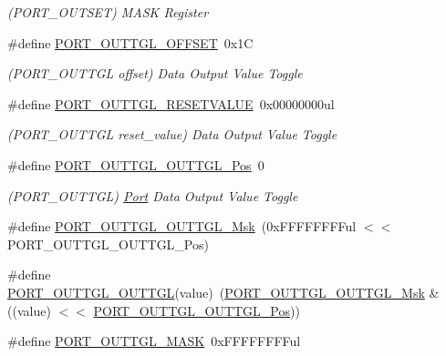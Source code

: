 \begin{DoxyCompactItemize}
\begin{DoxyCompactList}\small\item\em (P\+O\+R\+T\+\_\+\+O\+U\+T\+S\+ET) M\+A\+SK Register \end{DoxyCompactList}\item 
\#define \mbox{\hyperlink{group___s_a_m_d21___p_o_r_t_ga661859dca022c7deb7a367616d203747}{P\+O\+R\+T\+\_\+\+O\+U\+T\+T\+G\+L\+\_\+\+O\+F\+F\+S\+ET}}~0x1C
\begin{DoxyCompactList}\small\item\em (P\+O\+R\+T\+\_\+\+O\+U\+T\+T\+GL offset) Data Output Value Toggle \end{DoxyCompactList}\item 
\#define \mbox{\hyperlink{group___s_a_m_d21___p_o_r_t_ga487997310b5fc1ce56e003c201da8df2}{P\+O\+R\+T\+\_\+\+O\+U\+T\+T\+G\+L\+\_\+\+R\+E\+S\+E\+T\+V\+A\+L\+UE}}~0x00000000ul
\begin{DoxyCompactList}\small\item\em (P\+O\+R\+T\+\_\+\+O\+U\+T\+T\+GL reset\+\_\+value) Data Output Value Toggle \end{DoxyCompactList}\item 
\#define \mbox{\hyperlink{group___s_a_m_d21___p_o_r_t_ga9cccd9f68244563b806d73204ee44c3e}{P\+O\+R\+T\+\_\+\+O\+U\+T\+T\+G\+L\+\_\+\+O\+U\+T\+T\+G\+L\+\_\+\+Pos}}~0
\begin{DoxyCompactList}\small\item\em (P\+O\+R\+T\+\_\+\+O\+U\+T\+T\+GL) \mbox{\hyperlink{struct_port}{Port}} Data Output Value Toggle \end{DoxyCompactList}\item 
\#define \mbox{\hyperlink{group___s_a_m_d21___p_o_r_t_gad9024ad4caab786a0f4074a8e28f9638}{P\+O\+R\+T\+\_\+\+O\+U\+T\+T\+G\+L\+\_\+\+O\+U\+T\+T\+G\+L\+\_\+\+Msk}}~(0x\+F\+F\+F\+F\+F\+F\+F\+Ful $<$$<$ P\+O\+R\+T\+\_\+\+O\+U\+T\+T\+G\+L\+\_\+\+O\+U\+T\+T\+G\+L\+\_\+\+Pos)
\item 
\#define \mbox{\hyperlink{group___s_a_m_d21___p_o_r_t_ga41c33bcdaaea793dc1ee8f7b34ee05dd}{P\+O\+R\+T\+\_\+\+O\+U\+T\+T\+G\+L\+\_\+\+O\+U\+T\+T\+GL}}(value)~(\mbox{\hyperlink{group___s_a_m_d21___p_o_r_t_gad9024ad4caab786a0f4074a8e28f9638}{P\+O\+R\+T\+\_\+\+O\+U\+T\+T\+G\+L\+\_\+\+O\+U\+T\+T\+G\+L\+\_\+\+Msk}} \& ((value) $<$$<$ \mbox{\hyperlink{group___s_a_m_d21___p_o_r_t_ga9cccd9f68244563b806d73204ee44c3e}{P\+O\+R\+T\+\_\+\+O\+U\+T\+T\+G\+L\+\_\+\+O\+U\+T\+T\+G\+L\+\_\+\+Pos}}))
\item 
\#define \mbox{\hyperlink{group___s_a_m_d21___p_o_r_t_gabaf3cbe8835ddcd94e55d99946aa9c4c}{P\+O\+R\+T\+\_\+\+O\+U\+T\+T\+G\+L\+\_\+\+M\+A\+SK}}~0x\+F\+F\+F\+F\+F\+F\+F\+Ful

\end{DoxyCompactItemize}
